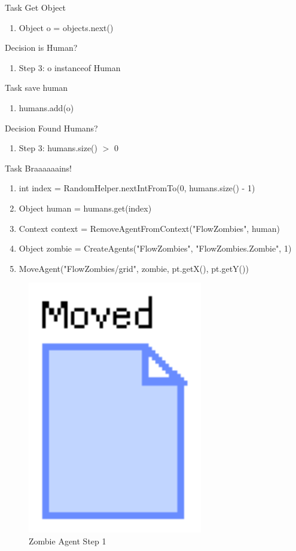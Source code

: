 \documentclass[11pt]{amsart}
\begin{document}
Task Get Object
\begin{enumerate}
 \item Object o = objects.next()
\end{enumerate}

Decision is Human?
\begin{enumerate}
 \item Step 3: o instanceof Human
\end{enumerate}

Task save human
\begin{enumerate}
 \item humans.add(o)
\end{enumerate}

Decision Found Humans?
\begin{enumerate}
 \item Step 3: humans.size() $>$ 0
\end{enumerate}

Task Braaaaaains!
\begin{enumerate}
 \item int index = RandomHelper.nextIntFromTo(0, humans.size() - 1)
 \item Object human = humans.get(index)
 \item Context context = RemoveAgentFromContext("FlowZombies", human)
 \item Object zombie = CreateAgents("FlowZombies", "FlowZombies.Zombie", 1)
 \item MoveAgent("FlowZombies/grid", zombie, pt.getX(), pt.getY())
\end{enumerate}

\begin{figure}[p]
\begin{center}
\vspace{.2in}
\centerline {
\includegraphics[width=3in]{figs/Zombie_1.eps}
}
\caption{Zombie Agent Step 1}
\label{fig:zombie1}
\end{center}\end{figure}
\end{document}
